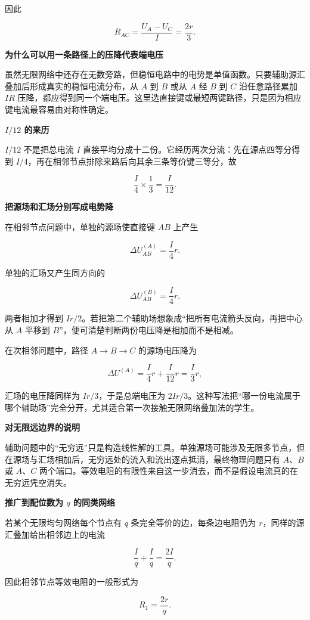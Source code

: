 \documentclass[12pt,a4paper,UTF8]{ctexart}
\begin{document}
因此

\[
\boxed{R_{AC}=\frac{U_A-U_C}{I}=\frac{2r}{3}}.
\tag{9}
\]

\textbf{为什么可以用一条路径上的压降代表端电压}

虽然无限网络中还存在无数旁路，但稳恒电路中的电势是单值函数。只要辅助源汇叠加后形成真实的稳恒电流分布，从
\(A\) 到 \(B\) 或从 \(A\) 经 \(B\) 到 \(C\) 沿任意路径累加 \(IR\)
压降，都应得到同一个端电压。这里选直接键或最短两键路径，只是因为相应键电流最容易由对称性确定。

\textbf{\(I/12\) 的来历}

\(I/12\) 不是把总电流 \(I\)
直接平均分成十二份。它经历两次分流：先在源点四等分得到
\(I/4\)，再在相邻节点排除来路后向其余三条等价键三等分，故

\[
\frac I4\times\frac13=\frac I{12}.
\]

\textbf{把源场和汇场分别写成电势降}

在相邻节点问题中，单独的源场使直接键 \(AB\) 上产生

\[
\Delta U_{AB}^{(A)}=\frac I4r.
\]

单独的汇场又产生同方向的

\[
\Delta U_{AB}^{(B)}=\frac I4r.
\]

两者相加才得到
\(Ir/2\)。若把第二个辅助场想象成``把所有电流箭头反向，再把中心从 \(A\)
平移到 \(B\)''，便可清楚判断两份电压降是相加而不是相减。

在次相邻问题中，路径 \(A\to B\to C\) 的源场电压降为

\[
\Delta U^{(A)}
=\frac I4r+\frac I{12}r
=\frac I3r,
\]

汇场的电压降同样为 \(Ir/3\)，于是总端电压为
\(2Ir/3\)。这种写法把``哪一份电流属于哪个辅助场''完全分开，尤其适合第一次接触无限网络叠加法的学生。

\textbf{对无限远边界的说明}

辅助问题中的``无穷远''只是构造线性解的工具。单独源场可能涉及无限多节点，但在源场与汇场相加后，无穷远处的流入和流出逐点抵消，最终物理问题只有
\(A\)、\(B\) 或 \(A\)、\(C\)
两个端口。等效电阻的有限性来自这一步消去，而不是假设电流真的在无穷远凭空消失。

\textbf{推广到配位数为 \(q\) 的同类网络}

若某个无限均匀网络每个节点有 \(q\) 条完全等价的边，每条边电阻仍为
\(r\)，同样的源汇叠加给出相邻边上的电流

\[
\frac Iq+\frac Iq=\frac{2I}{q}.
\]

因此相邻节点等效电阻的一般形式为

\[
R_1=\frac{2r}{q}.
\]
\end{document}
